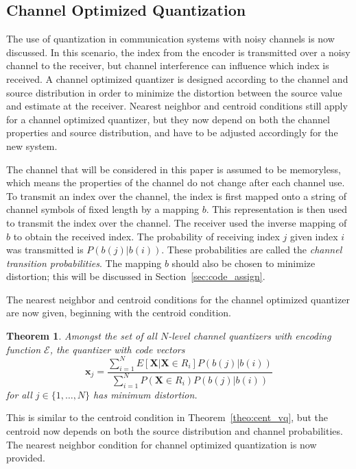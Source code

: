 \documentclass[10pt,twoside,titlepage]{article}
\newtheorem{theorem}{Theorem}[section]
\newcommand{\bx}{\mathbf{x}}
\newcommand{\bX}{\mathbf{X}}
\begin{document}
\subsection{Channel Optimized Quantization}
\label{sec:channel_optimized}
The use of quantization in communication systems with noisy channels is now discussed. In this scenario, the index from the encoder is transmitted over a noisy channel to the receiver, but channel interference can influence which index is received. A channel optimized quantizer is designed according to the channel and source distribution in order to minimize the distortion between the source value and estimate at the receiver. Nearest neighbor and centroid conditions still apply for a channel optimized quantizer, but they now depend on both the channel properties and source distribution, and have to be adjusted accordingly for the new system.

The channel that will be considered in this paper is assumed to be memoryless, which means the properties of the channel do not change after each channel use. To transmit an index over the channel, the index is first mapped onto a string of channel symbols of fixed length by a mapping $b$. This representation is then used to transmit the index over the channel. The receiver used the inverse mapping of $b$ to obtain the received index. The probability of receiving index $j$ given index $i$ was transmitted is $P(b(j)|b(i))$. These probabilities are called the \emph{channel transition probabilities}. The mapping $b$ should also be chosen to minimize distortion; this will be discussed in Section~\ref{sec:code_assign}.

The nearest neighbor and centroid conditions for the channel optimized quantizer are now given, beginning with the centroid condition.

\begin{theorem}
\label{theo:cent_covq}
Amongst the set of all $N$-level channel quantizers with encoding function $\mathcal{E}$, the quantizer with code vectors
\begin{equation}
  \label{eq:cent_covq}
  \bx_j = \frac{\sum_{i=1}^N E[\bX | \bX \in R_i]P(b(j)|b(i))}{\sum_{i=1}^N P( \bX \in R_i)P(b(j)|b(i))} 
\end{equation}
for all $j \in \{1,\ldots,N\}$ has minimum distortion.
\end{theorem}
This is similar to the centroid condition in Theorem~\ref{theo:cent_vq}, but the centroid now depends on both the source distribution and channel probabilities. The nearest neighbor condition for channel optimized quantization is now provided.
\end{document}
